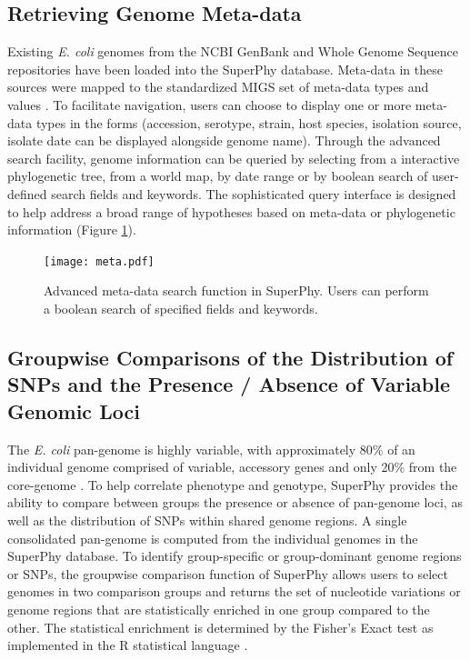 \documentclass[a4paper,twoside]{article}
\begin{document}
\subsection{Retrieving Genome Meta-data}

Existing \textit{E. coli} genomes from the NCBI GenBank and Whole Genome Sequence repositories \cite{benson2013genbank} have been loaded into the SuperPhy database. Meta-data in these sources were mapped to the standardized MIGS set of meta-data types and values \cite{field2008}. To facilitate navigation, users can choose to display one or more meta-data types in the forms (accession, serotype, strain, host species, isolation source, isolate date can be displayed alongside genome name). Through the advanced search facility, genome information can be queried by selecting from a interactive phylogenetic tree, from a world map, by date range or by boolean search of user-defined search fields and keywords.  The sophisticated query interface is designed to help address a broad range of hypotheses based on meta-data or phylogenetic information (Figure \ref{fig:search}).

\begin{figure}[t]
  \centering
   {\texttt{[image: meta.pdf]}}
   \vspace{0.2cm}
  \caption{Advanced meta-data search function in SuperPhy. Users can perform a boolean search of specified fields and keywords.}
  \label{fig:search}
\end{figure}


\subsection{Groupwise Comparisons of the Distribution of SNPs and the Presence / Absence of Variable Genomic Loci}

The \textit{E. coli} pan-genome is highly variable, with approximately 80\% of an individual genome comprised of variable, accessory genes and only 20\% from the core-genome \cite{lukjancenko_comparison_2010}. To help correlate phenotype and genotype, SuperPhy provides the ability to compare between groups the presence or absence of pan-genome loci, as well as the distribution of SNPs within shared genome regions. A single consolidated pan-genome is computed from the individual genomes in the SuperPhy database. To identify group-specific or group-dominant genome regions or SNPs, the groupwise comparison function of SuperPhy allows users to select genomes in two comparison groups and returns the set of nucleotide variations or genome regions that are statistically enriched in one group compared to the other. The statistical enrichment is determined by the Fisher's Exact test as implemented in the R statistical language \cite{R_manual}.
\end{document}
